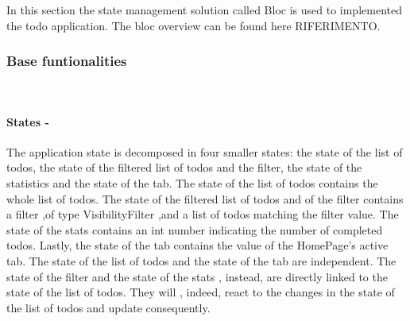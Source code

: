 In this section the state management solution called Bloc is used to implemented the todo application. The bloc overview can be found here RIFERIMENTO.
\subsubsection{Base funtionalities} \mbox{}\\ \label{par:todo_app_inherited_widget_introduction}
\paragraph{States - }
\label{subpar:todo_app_bloc_core_state}
The application state is decomposed in four smaller states: the state of the list of todos, the state of the filtered list of todos and the filter, the state of the statistics and the state of the tab. The state of the list of todos contains the whole list of todos. The state of the filtered list of todos and of the filter contains a filter ,of type VisibilityFilter ,and a list of todos matching the filter value. The state of the stats contains an int number indicating the number of completed todos. Lastly, the state of the tab contains the value of the HomePage’s active tab. The state of the list of todos and the state of the tab are independent. The state of the filter and the state of the stats , instead, are directly linked to the state of the list of todos. They will , indeed, react to the changes in the state of the list of todos and update consequently. 

